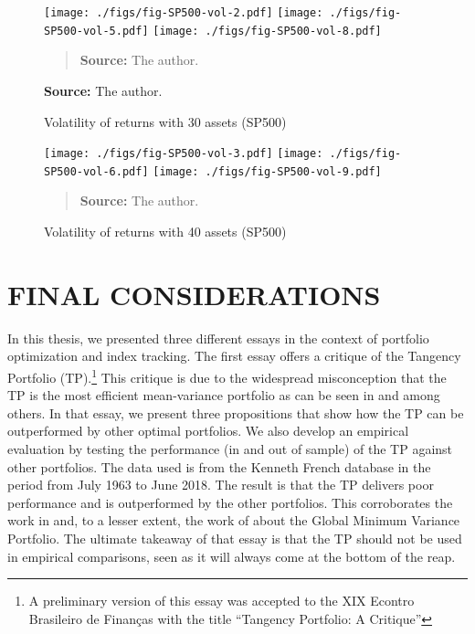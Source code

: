 \documentclass[12pt,oneside,a4paper]{memoir}
\begin{document}
\begin{figure}[htpb]
\centering
\footnotesize
\caption{Volatility of returns with 30 assets (SP500)}
\label{fig:sp500:vol:30a}
\texttt{[image: ./figs/fig-SP500-vol-2.pdf]}
\texttt{[image: ./figs/fig-SP500-vol-5.pdf]}
\texttt{[image: ./figs/fig-SP500-vol-8.pdf]}
\begin{quote}
\textbf{Source:} The author.
\end{quote}

\textbf{Source:} The author. \\
\end{figure}

\begin{figure}[htpb]
\centering
\footnotesize
\caption{Volatility of returns with 40 assets (SP500)}
\label{fig:sp500:vol:40a}
\texttt{[image: ./figs/fig-SP500-vol-3.pdf]}
\texttt{[image: ./figs/fig-SP500-vol-6.pdf]}
\texttt{[image: ./figs/fig-SP500-vol-9.pdf]}
\begin{quote}
\textbf{Source:} The author.
\end{quote}
\end{figure}

\chapter{FINAL CONSIDERATIONS}

In this thesis, we presented three different essays in the context of portfolio optimization and index tracking.
The first essay offers a critique of the Tangency Portfolio (TP).\footnote{A preliminary version of this essay was accepted to the XIX Econtro Brasileiro de Finanças with the title ``Tangency Portfolio: A Critique''}
This critique is due to the widespread misconception that the TP is the most efficient mean-variance portfolio as can be seen in  and  among others.
In that essay, we present three propositions that show how the TP can be outperformed by other optimal portfolios.
We also develop an empirical evaluation by testing the performance (in and out of sample) of the TP against other portfolios.
The data used is from the Kenneth French database in the period from July 1963 to June 2018.
The result is that the TP delivers poor performance and is outperformed by the other portfolios.
This corroborates the work in  and, to a lesser extent, the work of  about the Global Minimum Variance Portfolio.
The ultimate takeaway of that essay is that the TP should not be used in empirical comparisons, seen as it will always come at the bottom of the reap.
\end{document}
